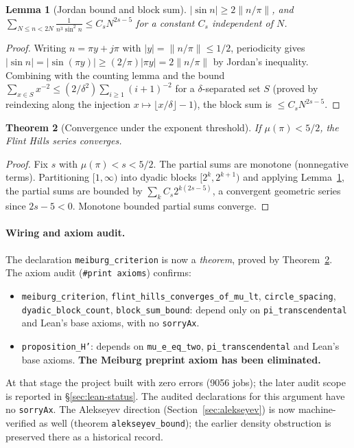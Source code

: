 \documentclass[11pt]{amsart}
\newtheorem{theorem}{Theorem}[section]
\newtheorem{lemma}[theorem]{Lemma}
\theoremstyle{definition}
\theoremstyle{remark}
\numberwithin{equation}{section}
\newcommand{\irr}{\mu}
\begin{document}
\begin{lemma}[Jordan bound and block sum]\label{lem:f2-blocksum}
$|\sin n|\ge2\|n/\pi\|$, and $\sum_{N\le n<2N}\frac1{n^3\sin^2 n}\le C_s N^{2s-5}$ for a constant $C_s$ independent of $N$.
\end{lemma}
\begin{proof}
Writing $n=\pi y+j\pi$ with $|y|=\|n/\pi\|\le1/2$, periodicity gives $|\sin n|=|\sin(\pi y)|\ge(2/\pi)|\pi y|=2\|n/\pi\|$ by Jordan's inequality. Combining with the counting lemma and the bound $\sum_{x\in S}x^{-2}\le(2/\delta^2)\sum_{i\ge1}(i+1)^{-2}$ for a $\delta$-separated set $S$ (proved by reindexing along the injection $x\mapsto\lfloor x/\delta\rfloor-1$), the block sum is $\le C_s N^{2s-5}$.
\end{proof}

\begin{theorem}[Convergence under the exponent threshold]\label{thm:f2-conv}
If $\irr(\pi)<5/2$, the Flint Hills series converges.
\end{theorem}
\begin{proof}
Fix $s$ with $\irr(\pi)<s<5/2$. The partial sums are monotone (nonnegative terms). Partitioning $[1,\infty)$ into dyadic blocks $[2^k,2^{k+1})$ and applying Lemma~\ref{lem:f2-blocksum}, the partial sums are bounded by $\sum_k C_s 2^{k(2s-5)}$, a convergent geometric series since $2s-5<0$. Monotone bounded partial sums converge.
\end{proof}

\paragraph{Wiring and axiom audit.} The declaration \texttt{meiburg\_\allowbreak{}criterion} is now a \emph{theorem}, proved by Theorem~\ref{thm:f2-conv}. The axiom audit (\texttt{\#print axioms}) confirms:
\begin{itemize}
\item \texttt{meiburg\_\allowbreak{}criterion}, \texttt{flint\_\allowbreak{}hills\_\allowbreak{}converges\_\allowbreak{}of\_\allowbreak{}mu\_\allowbreak{}lt}, \texttt{circle\_\allowbreak{}spacing}, \texttt{dyadic\_\allowbreak{}block\_\allowbreak{}count}, \texttt{block\_\allowbreak{}sum\_\allowbreak{}bound}: depend only on \texttt{pi\_transcendental} and Lean's base axioms, with no \texttt{sorryAx}.
\item \texttt{proposition\_\allowbreak{}H'}: depends on \texttt{mu\_e\_eq\_two}, \texttt{pi\_transcendental} and Lean's base axioms. \textbf{The Meiburg preprint axiom has been eliminated.}
\end{itemize}
At that stage the project built with zero errors (9056 jobs); the later audit scope is reported in \S\ref{sec:lean-status}. The audited declarations for this argument have no \texttt{sorryAx}. The Alekseyev direction (Section~\ref{sec:alekseyev}) is now machine-verified as well (theorem \texttt{alekseyev\_\allowbreak{}bound}); the earlier density obstruction is preserved there as a historical record.
\end{document}
